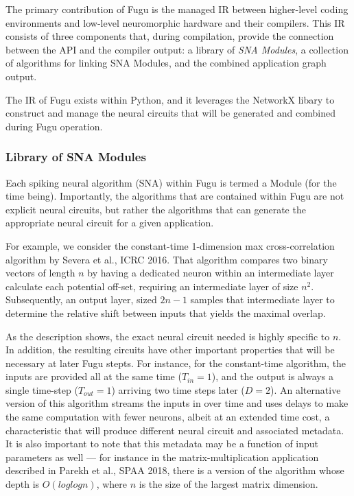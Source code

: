 \documentclass{article}
\begin{document}
The primary contribution of Fugu is the managed IR between higher-level coding environments and low-level neuromorphic hardware and their compilers.  This IR consists of three components that, during compilation, provide the connection between the API and the compiler output: a library of \textit{SNA Modules}, a collection of algorithms for linking SNA Modules, and the combined application graph output.  

The IR of Fugu exists within Python, and it leverages the NetworkX libary to construct and manage the neural circuits that will be generated and combined during Fugu operation.

\subsubsection{Library of SNA Modules}
Each spiking neural algorithm (SNA) within Fugu is termed a Module (for the time being).  Importantly, the algorithms that are contained within Fugu are not explicit neural circuits, but rather the algorithms that can generate the appropriate neural circuit for a given application.  

For example, we consider the constant-time 1-dimension max cross-correlation algorithm by Severa et al., ICRC 2016.  That algorithm compares two binary vectors of length $n$ by having a dedicated neuron within an intermediate layer calculate each potential off-set, requiring an intermediate layer of size $n^2$.  Subsequently, an output layer, sized $2n-1$ samples that intermediate layer to determine the relative shift between inputs that yields the maximal overlap.  

As the description shows, the exact neural circuit needed is highly specific to $n$.  In addition, the resulting circuits have other important properties that will be necessary at later Fugu stepts.  For instance, for the constant-time algorithm, the inputs are provided all at the same time ($T_{in} = 1$), and the output is always a single time-step ($T_{out} = 1$) arriving two time steps later ($D = 2$).  An alternative version of this algorithm streams the inputs in over time and uses delays to make the same computation with fewer neurons, albeit at an extended time cost, a characteristic that will produce different neural circuit and associated metadata.  It is also important to note that this metadata may be a function of input parameters as well --- for instance in the matrix-multiplication application described in Parekh et al., SPAA 2018, there is a version of the algorithm whose depth is $O(log log n)$, where $n$ is the size of the largest matrix dimension.  
\end{document}
